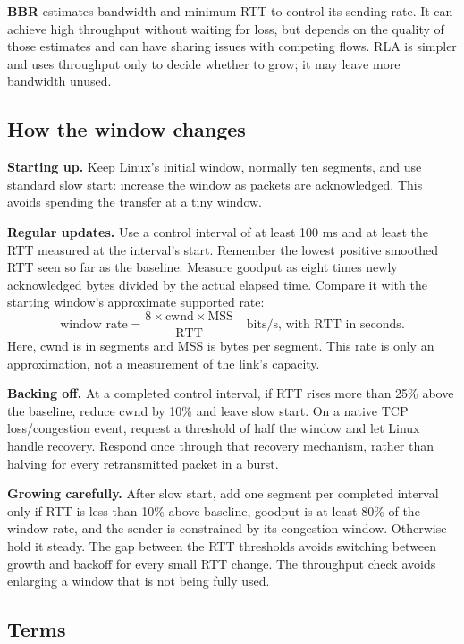 \documentclass[11pt]{article}
\begin{document}
\textbf{BBR} estimates bandwidth and minimum RTT to control its sending rate.
It can achieve high throughput without waiting for loss, but depends on the
quality of those estimates and can have sharing issues with competing flows.
RLA is simpler and uses throughput only to decide whether to grow; it may leave
more bandwidth unused.

\newpage
\subsection*{How the window changes}

\textbf{Starting up.} Keep Linux's initial window, normally ten segments, and
use standard slow start: increase the window as packets are acknowledged.
This avoids spending the transfer at a tiny window.

\textbf{Regular updates.} Use a control interval of at least 100 ms and at
least the RTT measured at the interval's start. Remember the lowest positive
smoothed RTT seen so far as the baseline. Measure goodput as eight times newly
acknowledged bytes divided by the actual elapsed time. Compare it with the starting
window's approximate supported rate:
\[
\text{window rate} = \frac{8\times\text{cwnd}\times\text{MSS}}{\text{RTT}}
\quad\text{bits/s, with RTT in seconds.}
\]
Here, cwnd is in segments and MSS is bytes per segment. This rate is only an
approximation, not a measurement of the link's capacity.

\textbf{Backing off.} At a completed control interval, if RTT rises more than
25\% above the baseline, reduce cwnd by 10\% and leave slow start. On a native TCP loss/congestion event,
request a threshold of half the window and let Linux handle recovery.
Respond once through that recovery mechanism, rather than halving for every
retransmitted packet in a burst.

\textbf{Growing carefully.} After slow start, add one segment per completed
interval only if RTT is less than 10\% above baseline, goodput is at least
80\% of the window rate, and the sender is constrained by its congestion
window. Otherwise hold it steady. The gap between the RTT thresholds avoids
switching between growth and backoff for every small RTT change. The
throughput check avoids enlarging a window that is not being fully used.

\subsection*{Terms}
\end{document}
